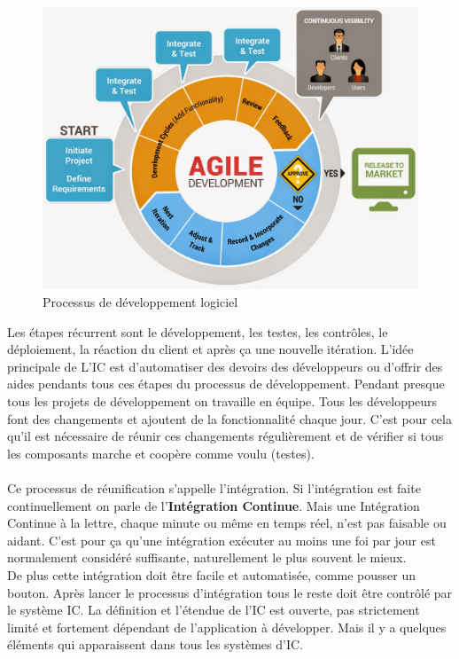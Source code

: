 \begin{figure}[H]
	\centering
		\includegraphics[scale=0.25]{bilder/agile_methodology}
	\caption{Processus de développement logiciel}
	\label{fig:processus}
\end{figure}

Les étapes récurrent sont le développement, les testes, les contrôles, le déploiement, la réaction du client et après ça une nouvelle itération. L'idée principale de L'IC est d'automatiser des devoirs des développeurs ou d'offrir des aides pendants tous ces étapes du processus de développement.
Pendant presque tous les projets de développement on travaille en équipe. Tous les développeurs font des changements et ajoutent de la fonctionnalité chaque jour. C'est pour cela qu'il est nécessaire de réunir ces changements régulièrement et de vérifier si tous les composants marche et coopère comme voulu (testes).\\\\
Ce processus de réunification s'appelle l'intégration. Si l'intégration est faite continuellement on parle de l'\textbf{Intégration Continue}. Mais une Intégration Continue à la lettre, chaque minute ou même en temps réel, n'est pas faisable ou aidant. C'est pour ça qu'une intégration exécuter au moins une foi par jour est normalement considéré suffisante, naturellement le plus souvent le mieux.\\
De plus cette intégration doit être facile et automatisée, comme pousser un bouton. Après lancer le processus d'intégration tous le reste doit être contrôlé par le système IC. La définition et l'étendue de l'IC est ouverte, pas strictement limité et fortement dépendant de l'application à développer. Mais il y a quelques éléments qui apparaissent dans tous les systèmes d'IC.
\newpage

